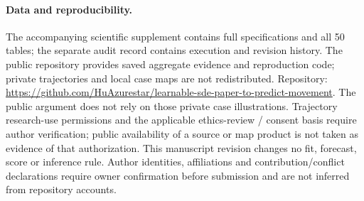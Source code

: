 \paragraph{Data and reproducibility.}\label{sec:case-horizons}\hypertarget{sec:case-horizons}{}
The accompanying scientific supplement contains full specifications and all
50 tables; the separate audit record contains execution and revision history.
The public repository provides saved aggregate evidence and reproduction
code; private trajectories and local case maps are not redistributed.
Repository: \url{https://github.com/HuAzurestar/learnable-sde-paper-to-predict-movement}.
The public argument does not rely on those private case illustrations.
Trajectory research-use permissions and the applicable ethics-review /
consent basis require author verification; public availability of a source
or map product is not taken as evidence of that authorization.
This manuscript revision changes no fit, forecast, score or inference rule.
Author identities, affiliations and contribution/conflict declarations
require owner confirmation before submission and are not inferred from
repository accounts.


